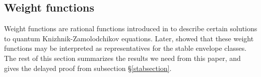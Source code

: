 \documentclass[12 pt]{article}
\theoremstyle{plain}
\theoremstyle{plain}
\theoremstyle{plain}
\theoremstyle{plain}
\theoremstyle{plain}
\theoremstyle{plain}
\theoremstyle{plain}
\theoremstyle{plain}
\theoremstyle{plain}
\theoremstyle{plain}
\theoremstyle{remark}
\theoremstyle{remark}
\theoremstyle{definition}
\theoremstyle{definition}
\theoremstyle{definition}
\theoremstyle{definition}
\theoremstyle{definition}
\theoremstyle{definition}
\DeclareMathOperator{\C}{\mathbb{C}}
\newcommand{\bT}{\mathsf{T}}
\begin{document}

\subsection{Weight functions}\label{weight-fcn-section}
Weight functions are rational functions introduced in \cite{TV} to describe certain solutions to quantum Knizhnik-Zamolodchikov equations. Later, \cite{RTV} showed that these weight functions may be interpreted as representatives for the stable envelope classes. The rest of this section summarizes the results we need from this paper, and gives the delayed proof from subsection \S\ref{stabsection}. 
\end{document}

